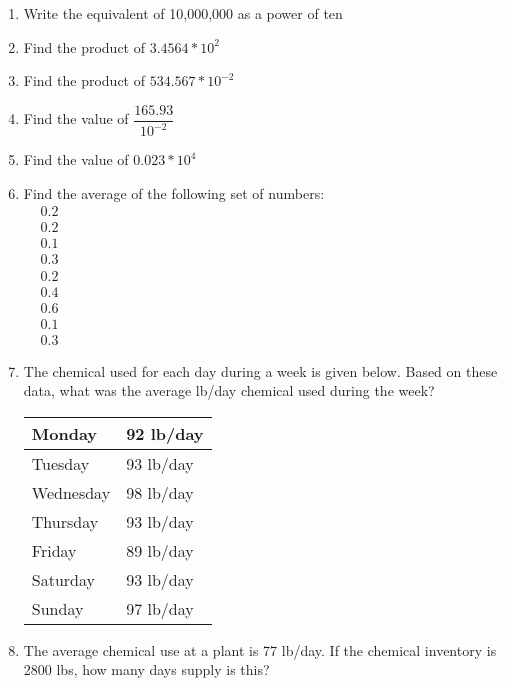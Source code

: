 \begin{enumerate}[1.]
\item Write the equivalent of 10,000,000 as a power of ten
\item Find the product of $3.4564*10^2$
\item Find the product of $534.567*10^{-2}$
\vspace{0.2cm}
\item Find the value of $\dfrac{165.93}{10^{-2}}$
\vspace{0.2cm}
\item Find the value of $0.023*10^4$
\item Find the average of the following set of numbers:\\
$
\begin{aligned}
&0.2 \\
&0.2 \\
&0.1 \\
&0.3 \\
&0.2 \\
&0.4 \\
&0.6 \\
&0.1 \\
&0.3
\end{aligned}
$

\item The chemical used for each day during a week is given below. Based on these data, what was the average lb/day chemical used during the week?\\

\begin{tabular}{|l|l|}
\hline
Monday & 92 lb/day\\
\hline
Tuesday & 93 lb/day \\
\hline
Wednesday & 98 lb/day\\
\hline
Thursday & 93 lb/day \\
\hline
Friday & 89 lb/day\\
\hline
Saturday & 93 lb/day \\
\hline
Sunday & 97 lb/day\\
\hline
\end{tabular}
\vspace{0.3cm}

\item The average chemical use at a plant is 77 lb/day. If the chemical inventory is 2800 lbs, how many days supply is this?
\end{enumerate}


